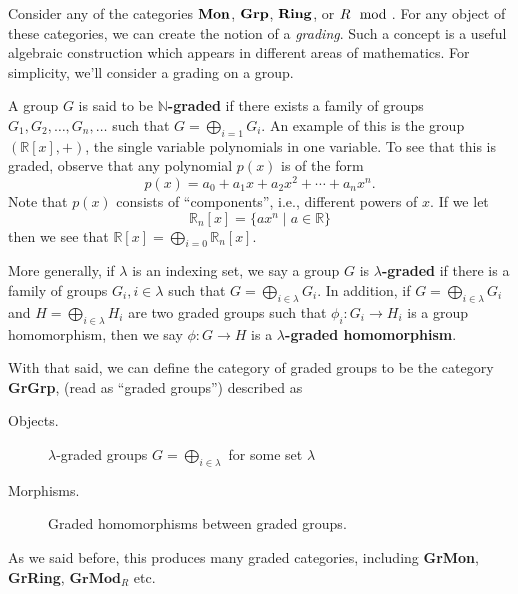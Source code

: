     \begin{example}
        Consider any of the categories $\operatorname{\mathbf{Mon}}$, $\operatorname{\mathbf{Grp}}$, $\operatorname{\mathbf{Ring}}$, or 
        $R\mod$. For any object of these categories, we can create 
        the notion of a \emph{grading}. Such a concept is a useful algebraic construction which 
        appears in different areas of mathematics. For simplicity, we'll consider a grading 
        on a group.

        A group $G$ is said to be \textbf{$\mathbb{N}$-graded} if there exists a family 
        of groups $G_1, G_2, \dots, G_n, \dots$ such that $G = \bigoplus_{i=1}G_i$.
        An example of this is the group $(\mathbb{R}[x], +)$, the single variable polynomials 
        in one variable. To see that this is graded, observe that any 
        polynomial $p(x)$ is of the form
        \[
            p(x) = a_0 + a_1x + a_2x^2 + \cdots + a_{n}x^n.
        \]
        Note that $p(x)$ consists of ``components'', i.e., different powers 
        of $x$. If we let 
        \[
            \mathbb{R}_n[x] = \{ax^n \mid a \in \mathbb{R}\}    
        \]
        then we see that $\mathbb{R}[x] = \bigoplus_{i = 0}\mathbb{R}_n[x]$. 

        More generally, if $\lambda$ is an indexing set, we say a group $G$ is \textbf{$\lambda$-graded} 
        if there is a family of groups $G_i, i \in \lambda$ such that $G = \bigoplus_{i \in \lambda}G_i$.
        In addition, if $G = \bigoplus_{i \in \lambda}G_i$ and $H = \bigoplus_{i \in \lambda}H_i$ 
        are two graded groups such that $\phi_i:G_i \to H_i$ is a group homomorphism, 
        then we say $\phi: G \to H$ is a \textbf{$\lambda$-graded homomorphism}.

        With that said, we can define the category of graded groups to be the category 
        \textbf{GrGrp}, (read as ``graded groups'') described as 
        \begin{description}
            \item[Objects.] $\lambda$-graded groups $G = \bigoplus_{i \in \lambda}$ 
            for some set $\lambda$ 
            \item[Morphisms.] Graded homomorphisms between graded groups.  
        \end{description}
        As we said before, this produces many graded categories, including \textbf{GrMon}, 
        \textbf{GrRing}, $\textbf{GrMod}_R$ etc.
    \end{example}

